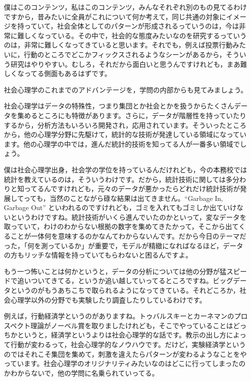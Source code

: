 \documentclass{ltjsbook}
\begin{document}
僕はこのコンテンツ，私はこのコンテンツ，みんなそれぞれ別のもの見てるわけですから，昔みたいに全員がこれについて何か考えて，同じ共通の対象にイメージを持っていて，社会全体としてのパターンが形成されるっていうのは，今は非常に難しくなっている。その中で，社会的な態度みたいなのを研究するっていうのは，非常に難しくなってきていると思います。それでも，例えば投票行動みたいに，行動のところでどこかフィックスされるようなシーンがあるから，そういう研究はやりやすい。むしろ，それだから面白いと思うんですけれども，まあ難しくなってる側面もあるはずです。

社会心理学のこれまでのアドバンテージを，学問の内部からも見てみましょう。

社会心理学はデータの特殊性，つまり集団とか社会とかを扱うからたくさんデータを集めるところにも特徴があります。さらに，データが階層性を持っていたりするから，分析方法もいろいろ開発され，応用されています。そういったところから，他の心理学分野に先駆けて，統計的な技術が発達している領域になっています。他の心理学の中では，進んだ統計的技術を知ってる人が一番多い領域でしょう。

僕は社会心理学出身，社会学の学位を持っているんだけれども，今の本務校では統計を教えているのは，そういうわけです。だから，統計技術に関しては多分わりと知ってるんですけれども，元々のデータが悪かったらどれだけ統計技術が発展してっても，当然のことながら碌な結果は出てきません。``Garbage In, Garbage Out'' といわれるのですけれども，ゴミを入れてもゴミしか出ていけないというわけですね。統計技術がいくら進んでいたのかといって，変なデータを取っていて，わけのわからない根拠の数字を集めてきたかって，そこから出てくることが一体何を意味するのかなんてわからないんです。だから今日のテーマだった，「何を測っているか」が重要で，モデルが精緻になればなるほど，データの方もリッチな情報を持っていてもらわないと困るんですよ。

もう一つ怖いことは何かというと，データの分析については他の分野が猛スピードで追いついてきてる，というか追い越していってるところですね。ビッグデータというのがもうあちこちで取られるようになってきている。それどころか，社会心理学以外の分野でも実験したり調査したりしているわけです。

例えば，行動経済学というのがありますね。トゥバルスキーとカーネマンのプロスペクト理論がノーベル賞を取りましたけれども，そこでやっていることはどっちかというと，経済学というよりは社会心理学的な話です。教示の出し方によって行動が変わるって，社会心理学的なノウハウです。だけど，実験経済学というのではそれこそ集団を集めて，刺激を違えたらパターンが変わるようなことをやっています。社会心理学のオリジナリティみたいなのはどこに行ってしまったのかわからないで，他の学問に名乗られていってる。
\end{document}
